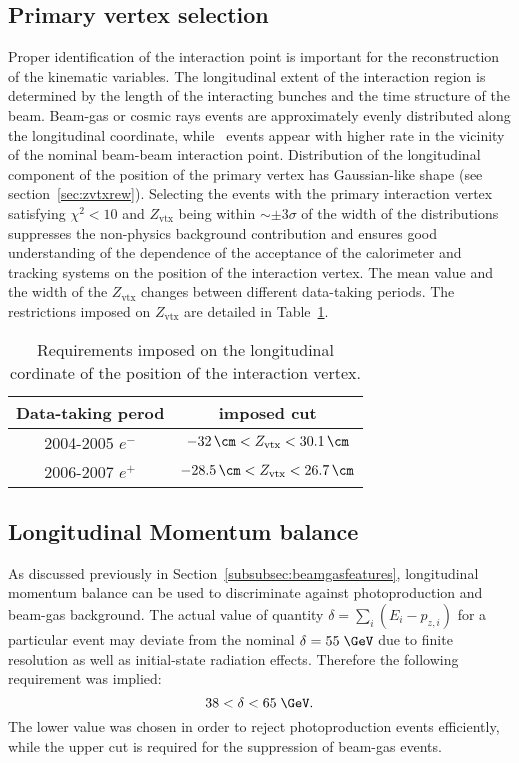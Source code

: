 \subsection{Primary vertex selection}
\label{subsec:vtxselect}
Proper identification of the interaction point is important for the reconstruction of the kinematic variables. The longitudinal extent of the interaction region is determined by the length of the interacting bunches and the time structure of the beam. Beam-gas or cosmic rays events are approximately evenly distributed along the longitudinal coordinate, while \ep\, events appear with higher rate in the vicinity of the nominal beam-beam interaction point. Distribution of the longitudinal component of the position of the primary vertex has Gaussian-like shape (see section~\ref{sec:zvtxrew}). Selecting the events with the primary interaction vertex satisfying $\chi^2 < 10$ and $Z_\text{vtx}$ being within $\sim \pm 3\sigma$ of the width of the distributions suppresses the non-physics background contribution and ensures good understanding of the dependence of the acceptance of the calorimeter and tracking systems on the position of the interaction vertex. The mean value and the width of the $Z_\text{vtx}$ changes between different data-taking periods. The restrictions imposed on $Z_\text{vtx}$ are detailed in Table~\ref{tab:zvxcut}.
\begin{table}[htbp]
	\centering
		\begin{tabular}{|c|c|}
			\hline
			Data-taking perod & imposed cut \\
			\hline
			\hline
			2004-2005 $e^{-}$ & $-32\,\cm<Z_\text{vtx}<30.1\,\cm$ \\
			2006-2007 $e^{+}$ & $-28.5\,\cm<Z_\text{vtx}<26.7\,\cm$ \\
			\hline
		\end{tabular}
	\caption{Requirements imposed on the longitudinal cordinate of the position of the interaction vertex.}
	\label{tab:zvxcut}
\end{table}

\subsection{Longitudinal Momentum balance}
\label{subsec:empzcut}
As discussed previously in Section~\ref{subsubsec:beamgasfeatures}, longitudinal momentum balance can be used to discriminate against photoproduction and beam-gas background. The actual value of quantity $\delta=\sum_i{\left(E_i-p_{z,i}\right)}$ for a particular event may deviate from the nominal $\delta=55\;\GeV$ due to finite resolution as well as initial-state radiation effects. Therefore the following requirement was implied:
\begin{equation}
38 < \delta < 65\;\GeV.
\label{eq:epmzcut}
\end{equation}
The lower value was chosen in order to reject photoproduction events efficiently, while the upper cut is required for the suppression of beam-gas events.

